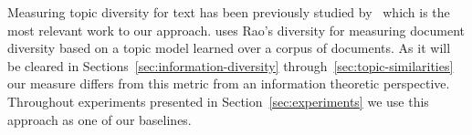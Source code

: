 Measuring topic diversity for text has been previously studied by~\cite{bache:2013} which is the most relevant work to our approach. \citep{bache:2013} uses Rao's diversity \cite{rao:1982} for measuring document diversity based on a topic model learned over a corpus of documents. As it will be cleared in Sections~\ref{sec:information-diversity} through~\ref{sec:topic-similarities} our measure differs from this metric from an information theoretic perspective. Throughout experiments presented in Section~\ref{sec:experiments} we use this approach as one of our baselines.